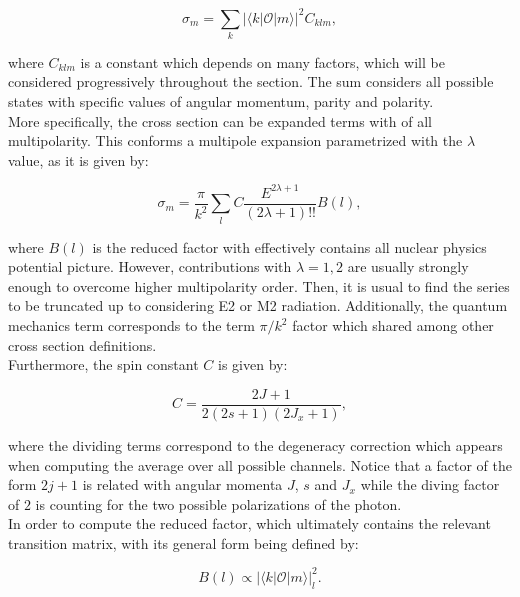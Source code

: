 \documentclass[openany]{book}
\begin{document}
\begin{equation}  \label{eq:radiativeCapture_crossSection}
	\sigma_m = \sum_{k}{|\langle k | \mathcal{O} | m \rangle|^2} C_{klm},		
\end{equation}

where $C_{klm}$ is a constant which depends on many factors, which will be considered progressively throughout the section. The sum considers all possible states with specific values of angular momentum, parity and polarity. \\

More specifically, the cross section can be expanded terms with of all multipolarity. This conforms a multipole expansion  parametrized with the $\lambda$ value, as it is given by: 

\begin{equation}  \label{eq:radiativeCapture_crossSection_l}
	\sigma_m = \frac{\pi}{k^2} \sum_{l} C \frac{E^{2\lambda +1}}{(2\lambda+1)!!} B(l), 		
\end{equation}

where $B(l)$ is the reduced factor with effectively contains all nuclear physics potential picture. However, contributions with $\lambda = 1, 2$ are usually strongly enough to overcome higher multipolarity order. Then, it is usual to find the series to be truncated up to considering E2 or M2 radiation. Additionally, the quantum mechanics term corresponds to the term $\pi/k^2$ factor which shared among other cross section definitions. \\

Furthermore, the spin constant $C$ is given by: 

\begin{equation} \label{eq:radiativeCapture_spinConstant}
	C =  \frac{ 2J + 1}{2(2s + 1) (2J_x + 1)}, 
\end{equation}

where the dividing terms correspond to the degeneracy correction which appears when computing the average over all possible channels. Notice that a factor of the form $2j +1$ is related with angular momenta $J$, $s$ and $J_x$ while the diving factor of $2$ is counting for the two possible polarizations of the photon.  \\

In order to compute the reduced factor, which ultimately contains the relevant transition matrix, with its general form being defined by:

\begin{equation}  \label{eq:radiativeCapture_reducedFactor}
	B(l) \propto   |{\langle k | \mathcal{O} | m \rangle}|^{2}_{l}.
\end{equation}
\end{document}
